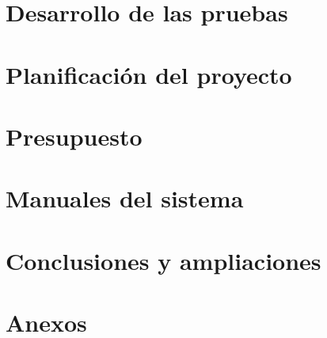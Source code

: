 \documentclass{report}
\begin{document}
\chapter{Desarrollo de las pruebas}
\label{chapter:desarrollo_pruebas}


\chapter{Planificación del proyecto}
\label{chapter:planificacion}


\chapter{Presupuesto}
\label{chapter:presupuesto}


\chapter{Manuales del sistema}
\label{chapter08}


\chapter{Conclusiones y ampliaciones}
\label{chapter:conclusiones_ampliaciones}


\chapter{Anexos}
\label{anexos}


\printbibliography
\end{document}
